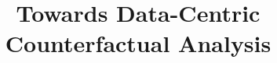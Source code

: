\documentclass[sigconf,nonacm]{lib/acmart}
\title{Towards Data-Centric Counterfactual Analysis}
\begin{document}
\begin{sloppy}
    


\maketitle











\clearpage

\balance



\appendix


\end{sloppy}
\end{document}
